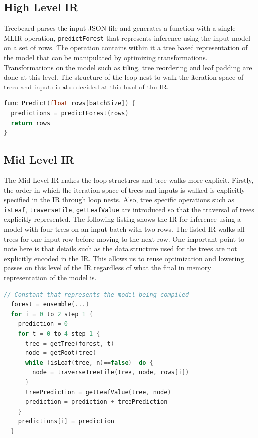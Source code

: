 \subsection{High Level IR}
Treebeard parses the input JSON file and generates a function with a single MLIR operation, \texttt{predictForest} that represents inference using the input model on a set of rows. The operation contains within it a tree based representation of the model that can be manipulated by optimizing transformations. Transformations on the model such as tiling, tree reordering and leaf padding are done at this level. The structure of the loop nest to walk the iteration space of trees and inputs is also decided at this level of the IR. 

\begin{lstlisting}[language=C++]
func Predict(float rows[batchSize]) {
  predictions = predictForest(rows) 
  return rows
}
\end{lstlisting}

\subsection{Mid Level IR}
The Mid Level IR makes the loop structures and tree walks more explicit. Firstly, the order in which the iteration space of trees and inputs is walked is explicitly specified in the IR through loop nests. Also, tree specific operations such as \texttt{isLeaf}, \texttt{traverseTile}, \texttt{getLeafValue} are introduced so that the traversal of trees explicitly represented. The following listing shows the IR for inference using a model with four trees on an input batch with two rows. The listed IR walks all trees for one input row before moving to the next row. One important point to note here is that details such as the data structure used for the trees are not explicitly encoded in the IR. This allows us to reuse optimization and lowering passes on this level of the IR regardless of what the final in memory representation of the model is.

\begin{lstlisting}[language=C++]
  // Constant that represents the model being compiled
  forest = ensemble(...)
  for i = 0 to 2 step 1 {
    prediction = 0
    for t = 0 to 4 step 1 {
      tree = getTree(forest, t) 
      node = getRoot(tree)
      while (isLeaf(tree, n)==false)  do {
        node = traverseTreeTile(tree, node, rows[i])
      }
      treePrediction = getLeafValue(tree, node)
      prediction = prediction + treePrediction
    }
    predictions[i] = prediction
  }
\end{lstlisting}

